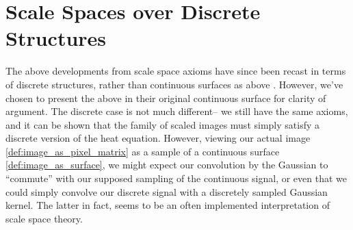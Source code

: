 %    	
%    	
%    
    
    
    \section{Scale Spaces over Discrete Structures} \label{subsec:discrete-scale-space}
    
    The above developments from scale space axioms have since
    been recast in terms of discrete structures, rather than continuous surfaces as above \cite{lindeberg-discrete}. However, we've chosen to present the above in their original continuous surface for clarity of argument. The discrete case is not much different--
    we still have the same axioms, and it can be shown that the family of scaled images
    must simply satisfy a discrete version of the heat equation.
    However, viewing our actual image
    \cref{def:image_as_pixel_matrix} as a sample of a continuous
    surface \cref{def:image_as_surface},
    we might  expect our convolution by the Gaussian to ``commute'' with our supposed sampling of the continuous signal,
    or even that we could simply convolve our discrete signal with a discretely sampled Gaussian kernel. The latter in fact, seems to be an often implemented interpretation of scale space theory.
    
